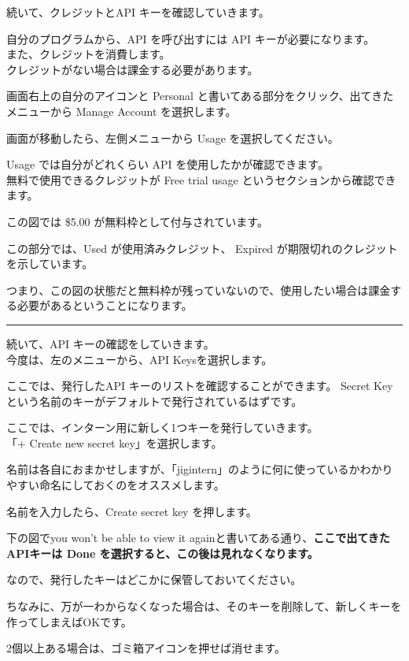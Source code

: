 続いて、クレジットとAPI キーを確認していきます。

自分のプログラムから、API を呼び出すには API キーが必要になります。\\
また、クレジットを消費します。\\
クレジットがない場合は課金する必要があります。

画面右上の自分のアイコンと Personal
と書いてある部分をクリック、出てきたメニューから Manage Account
を選択します。

画面が移動したら、左側メニューから Usage を選択してください。

Usage では自分がどれくらい API を使用したかが確認できます。\\
無料で使用できるクレジットが Free trial usage
というセクションから確認できます。

この図では \$5.00 が無料枠として付与されています。

この部分では、Used が使用済みクレジット、 Expired
が期限切れのクレジットを示しています。

つまり、この図の状態だと無料枠が残っていないので、使用したい場合は課金する必要があるということになります。

\begin{center}\rule{0.5\linewidth}{0.5pt}\end{center}

続いて、API キーの確認をしていきます。\\
今度は、左のメニューから、API Keysを選択します。

ここでは、発行したAPI キーのリストを確認することができます。 Secret Key
という名前のキーがデフォルトで発行されているはずです。

ここでは、インターン用に新しく1つキーを発行していきます。\\
「+ Create new secret key」を選択します。

名前は各自におまかせしますが、「jigintern」のように何に使っているかわかりやすい命名にしておくのをオススメします。

名前を入力したら、Create secret key を押します。

下の図でyou won't be able to view it
againと書いてある通り、\textbf{ここで出てきたAPIキーは Done
を選択すると、この後は見れなくなります。}

なので、発行したキーはどこかに保管しておいてください。

ちなみに、万が一わからなくなった場合は、そのキーを削除して、新しくキーを作ってしまえばOKです。

2個以上ある場合は、ゴミ箱アイコンを押せば消せます。


